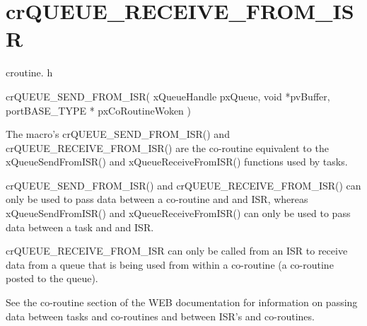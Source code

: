 \hypertarget{group__cr_q_u_e_u_e___r_e_c_e_i_v_e___f_r_o_m___i_s_r}{\section{cr\-Q\-U\-E\-U\-E\-\_\-\-R\-E\-C\-E\-I\-V\-E\-\_\-\-F\-R\-O\-M\-\_\-\-I\-S\-R}
\label{group__cr_q_u_e_u_e___r_e_c_e_i_v_e___f_r_o_m___i_s_r}
}
croutine. h 
\begin{DoxyPre}
  crQUEUE\_SEND\_FROM\_ISR(
                            xQueueHandle pxQueue,
                            void *pvBuffer,
                            portBASE\_TYPE * pxCoRoutineWoken
                       )\end{DoxyPre}


The macro's cr\-Q\-U\-E\-U\-E\-\_\-\-S\-E\-N\-D\-\_\-\-F\-R\-O\-M\-\_\-\-I\-S\-R() and cr\-Q\-U\-E\-U\-E\-\_\-\-R\-E\-C\-E\-I\-V\-E\-\_\-\-F\-R\-O\-M\-\_\-\-I\-S\-R() are the co-\/routine equivalent to the x\-Queue\-Send\-From\-I\-S\-R() and x\-Queue\-Receive\-From\-I\-S\-R() functions used by tasks.

cr\-Q\-U\-E\-U\-E\-\_\-\-S\-E\-N\-D\-\_\-\-F\-R\-O\-M\-\_\-\-I\-S\-R() and cr\-Q\-U\-E\-U\-E\-\_\-\-R\-E\-C\-E\-I\-V\-E\-\_\-\-F\-R\-O\-M\-\_\-\-I\-S\-R() can only be used to pass data between a co-\/routine and and I\-S\-R, whereas x\-Queue\-Send\-From\-I\-S\-R() and x\-Queue\-Receive\-From\-I\-S\-R() can only be used to pass data between a task and and I\-S\-R.

cr\-Q\-U\-E\-U\-E\-\_\-\-R\-E\-C\-E\-I\-V\-E\-\_\-\-F\-R\-O\-M\-\_\-\-I\-S\-R can only be called from an I\-S\-R to receive data from a queue that is being used from within a co-\/routine (a co-\/routine posted to the queue).

See the co-\/routine section of the W\-E\-B documentation for information on passing data between tasks and co-\/routines and between I\-S\-R's and co-\/routines.


